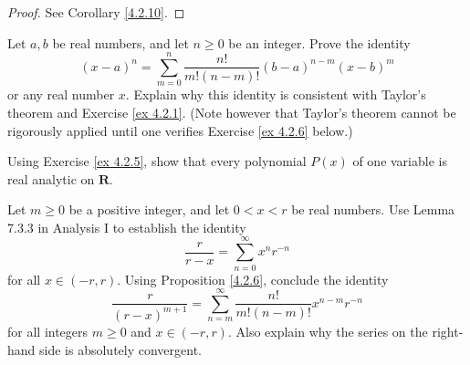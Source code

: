 \begin{proof}
    See Corollary \ref{4.2.10}.
\end{proof}

\begin{exercise}\label{ex 4.2.5}
    Let \(a, b\) be real numbers, and let \(n \geq 0\) be an integer.
    Prove the identity
    \[
        (x - a)^n = \sum_{m = 0}^n \frac{n!}{m! (n - m)!} (b - a)^{n - m} (x - b)^m
    \]
    or any real number \(x\).
    Explain why this identity is consistent with Taylor's theorem and Exercise \ref{ex 4.2.1}.
    (Note however that Taylor's theorem cannot be rigorously applied until one verifies Exercise \ref{ex 4.2.6} below.)
\end{exercise}

\begin{exercise}\label{ex 4.2.6}
    Using Exercise \ref{ex 4.2.5}, show that every polynomial \(P(x)\) of one variable is real analytic on \(\mathbf{R}\).
\end{exercise}

\begin{exercise}\label{ex 4.2.7}
    Let \(m \geq 0\) be a positive integer, and let \(0 < x < r\) be real numbers.
    Use Lemma 7.3.3 in Analysis I to establish the identity
    \[
        \frac{r}{r - x} = \sum_{n = 0}^\infty x^n r^{-n}
    \]
    for all \(x \in (-r, r)\).
    Using Proposition \ref{4.2.6}, conclude the identity
    \[
        \frac{r}{(r - x)^{m + 1}} = \sum_{n = m}^\infty \frac{n!}{m! (n - m)!} x^{n - m} r^{-n}
    \]
    for all integers \(m \geq 0\) and \(x \in (-r, r)\).
    Also explain why the series on the right-hand side is absolutely convergent.
\end{exercise}

